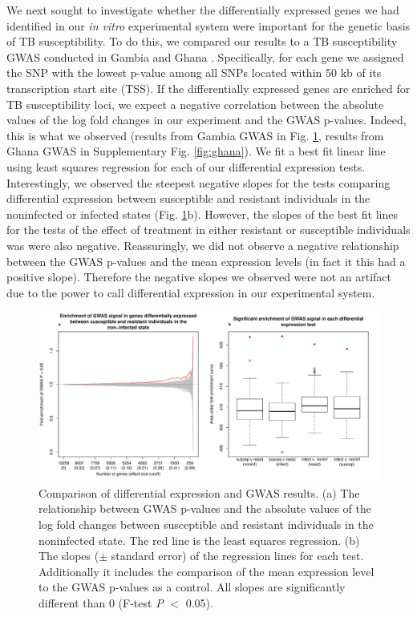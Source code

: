 \documentclass[fleqn,10pt]{wlscirep}
\begin{document}
We next sought to investigate whether the differentially expressed genes we had identified in our \emph{in vitro} experimental system were important for the genetic basis of TB susceptibility. To do this, we compared our results to a TB susceptibility GWAS conducted in Gambia and Ghana \cite{Thye2010}. Specifically, for each gene we assigned the SNP with the lowest p-value among all SNPs located within 50 kb of its transcription start site (TSS). If the differentially expressed genes are enriched for TB susceptibility loci, we expect a negative correlation between the absolute values of the log fold changes in our experiment and the GWAS p-values. Indeed, this is what we observed (results from Gambia GWAS in Fig. \ref{fig:gwas}, results from Ghana GWAS in Supplementary Fig. \ref{fig:ghana}). We fit a best fit linear line using least squares regression for each of our differential expression tests. Interestingly, we observed the steepest negative slopes for the tests comparing differential expression between susceptible and resistant individuals in the noninfected or infected states (Fig. \ref{fig:gwas}b). However, the slopes of the best fit lines for the tests of the effect of treatment in either resistant or susceptible individuals was were also negative. Reassuringly, we did not observe a negative relationship between the GWAS p-values and the mean expression levels (in fact it this had a positive slope). Therefore the negative slopes we observed were not an artifact due to the power to call differential expression in our experimental system.

\begin{figure}[ht]
\centering
\includegraphics[width=\linewidth]{../figure/gwas.pdf}
\caption{
Comparison of differential expression and GWAS results. (a) The relationship between GWAS p-values \cite{Thye2010} and the absolute values of the log fold changes between susceptible and resistant individuals in the noninfected state. The red line is the least squares regression. (b) The slopes ($\pm$ standard error) of the regression lines for each test. Additionally it includes the comparison of the mean expression level to the GWAS p-values as a control. All slopes are significantly different than 0 (F-test \emph{P} $<$ 0.05).
}
\label{fig:gwas}
\end{figure}
\end{document}
